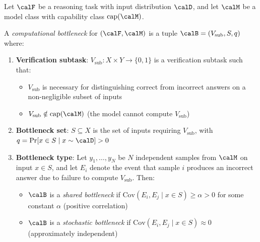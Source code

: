 

\begin{definition}
\label{def:bottleneck}
Let $\calF$ be a reasoning task with input distribution $\calD$, and let $\calM$ be a model class with capability class $\mathrm{cap}(\calM)$.

A \emph{computational bottleneck} for $(\calF, \calM)$ is a tuple $\calB = (V_{\text{sub}}, S, q)$ where:
\begin{enumerate}[label=(\roman*)]
    \item \textbf{Verification subtask}: $V_{\text{sub}} : X \times Y \to \{0,1\}$ is a verification subtask such that:
    \begin{itemize}
        \item $V_{\text{sub}}$ is necessary for distinguishing correct from incorrect answers on a non-negligible subset of inputs
        \item $V_{\text{sub}} \notin \mathrm{cap}(\calM)$ (the model cannot compute $V_{\text{sub}}$)
    \end{itemize}

    \item \textbf{Bottleneck set}: $S \subseteq X$ is the set of inputs requiring $V_{\text{sub}}$, with $q = \Pr[x \in S \mid x \sim \calD] > 0$

    \item \textbf{Bottleneck type}: Let $y_1, \ldots, y_N$ be $N$ independent samples from $\calM$ on input $x \in S$, and let $E_i$ denote the event that sample $i$ produces an incorrect answer due to failure to compute $V_{\text{sub}}$. Then:
    \begin{itemize}
        \item $\calB$ is a \emph{shared bottleneck} if $\mathrm{Cov}(E_i, E_j \mid x \in S) \geq \alpha > 0$ for some constant $\alpha$ (positive correlation)
        \item $\calB$ is a \emph{stochastic bottleneck} if $\mathrm{Cov}(E_i, E_j \mid x \in S) \approx 0$ (approximately independent)
    \end{itemize}
\end{enumerate}
\end{definition}


